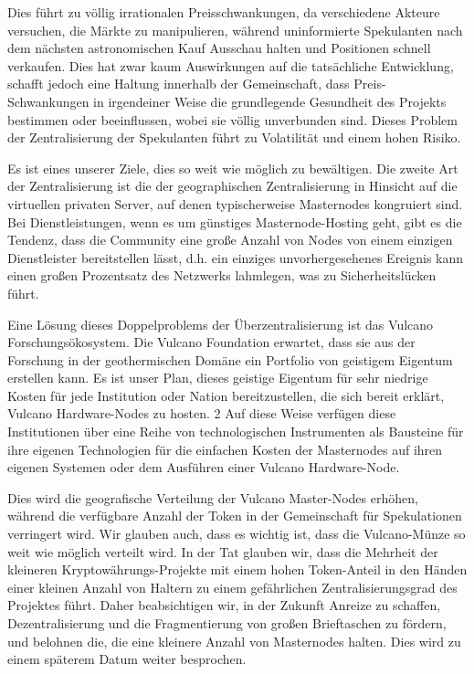 \documentclass[A4paper, 12pt]{article}
\begin{document}
Dies führt zu völlig irrationalen Preisschwankungen, da verschiedene Akteure versuchen, die Märkte zu manipulieren, während uninformierte Spekulanten nach dem nächsten astronomischen Kauf Ausschau halten und Positionen schnell verkaufen. Dies hat zwar kaum Auswirkungen auf die tatsächliche Entwicklung, schafft jedoch eine Haltung innerhalb der Gemeinschaft, dass Preis-Schwankungen in irgendeiner Weise die grundlegende Gesundheit des Projekts bestimmen oder beeinflussen, wobei sie völlig unverbunden sind. Dieses Problem der Zentralisierung der Spekulanten führt zu Volatilität und einem hohen Risiko. 

Es ist eines unserer Ziele, dies so weit wie möglich zu bewältigen. Die zweite Art der Zentralisierung ist die der geographischen Zentralisierung in Hinsicht auf die virtuellen privaten Server, auf denen typischerweise Masternodes kongruiert sind. Bei Dienstleistungen, wenn es um günstiges Masternode-Hosting geht, gibt es die Tendenz, dass die Community eine große Anzahl von Nodes von einem einzigen Dienstleister bereitstellen lässt, d.h. ein einziges unvorhergesehenes Ereignis kann einen großen Prozentsatz des Netzwerks lahmlegen, was zu Sicherheitslücken führt. 

Eine Lösung dieses Doppelproblems der Überzentralisierung ist das Vulcano Forschungsökosystem. Die Vulcano Foundation erwartet, dass sie aus der Forschung in der geothermischen Domäne ein Portfolio von geistigem Eigentum erstellen kann. Es ist unser Plan, dieses geistige Eigentum für sehr niedrige Kosten für jede Institution oder Nation bereitzustellen, die sich bereit erklärt, Vulcano Hardware-Nodes zu hosten. 2 Auf diese Weise verfügen diese Institutionen über eine Reihe von technologischen Instrumenten als Bausteine für ihre eigenen Technologien für die einfachen Kosten der Masternodes auf ihren eigenen Systemen oder dem Ausführen einer Vulcano Hardware-Node. 

Dies wird die geografische Verteilung der Vulcano Master-Nodes erhöhen, während die verfügbare Anzahl der Token in der Gemeinschaft für Spekulationen verringert wird. Wir glauben auch, dass es wichtig ist, dass die Vulcano-Münze so weit wie möglich verteilt wird. In der Tat glauben wir, dass die Mehrheit der kleineren Kryptowährungs-Projekte mit einem hohen Token-Anteil in den Händen einer kleinen Anzahl von Haltern zu einem gefährlichen Zentralisierungsgrad des Projektes führt. Daher beabsichtigen wir, in der Zukunft Anreize zu schaffen, Dezentralisierung und die Fragmentierung von großen Brieftaschen zu fördern, und belohnen die, die eine kleinere Anzahl von Masternodes halten. Dies wird zu einem späterem Datum weiter besprochen. 
\end{document}
